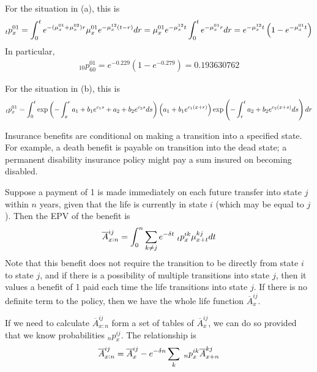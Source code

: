 \documentclass[hidelinks, 12pt]{article}
\theoremstyle{mydefstyle}
\theoremstyle{mythmstyle}
\begin{document}
For the situation in (a), this is
\begin{gather*}
\hspace{0mm}_tp_x^{01}
= \int_0^t e^{-(\mu_x^{01} + \mu_x^{02})r} \mu_x^{01} e^{-\mu_x^{12}(t-r)} dr
= \mu_x^{01} e^{-\mu_x^{12} t} \int_0^t e^{-\mu_x^{01} r} dr
= e^{-\mu_x^{12} t} \left( 1 - e^{-\mu_x^{01} t} \right)
\end{gather*}
In particular,
\begin{gather*}
_{10}p_{60}^{01} = e^{-0.229} \left(1 - e^{-0.279} \right) = 0.193630762
\end{gather*}

For the situation in (b), this is
\begin{gather*}
\hspace{0mm}_tp_x^{01}
= \int_0^t 
\exp \left( - \int_x^r a_1 + b_1 e^{c_1 s} + a_2 + b_2 e^{c_2 s} ds \right)
\left(a_1 + b_1 e^{c_1(x+r)} \right)
\exp \left( - \int_r^t a_2 + b_2 e^{c_2 (x+s) } ds \right) dr
\end{gather*}

Insurance benefits are conditional on making a transition into a specified state. For example, a death benefit is payable on transition into the dead state; a permanent disability insurance policy might pay a sum insured on becoming disabled.

Suppose a payment of 1 is made immediately on each future transfer into state $j$ within $n$ years, given that the life is currently in state $i$ (which may be equal to $j$). Then the EPV of the benefit is
\begin{gather*}
\overline{A}_{x:n}^{ij} = \int_0^n \sum_{k \ne j} e^{-\delta t} \hspace{1mm}_tp_x^{ik} \mu_{x+t}^{kj} dt
\end{gather*}
Note that this benefit does not require the transition to be directly from state $i$ to state $j$, and if there is a possibility of multiple transitions into state $j$, then it values a benefit of 1 paid each time the life transitions into state $j$. If there is no definite term to the policy, then we have the whole life function $\overline{A}_x^{ij}$. 

If we need to calculate $\overline{A}_{x:n}^{ij}$ form a set of tables of $\overline{A}_x^{ij}$, we can do so provided that we know probabilities $_np_x^{ij}$. The relationship is
\begin{gather*}
\overline{A}_{x:n}^{ij} = \overline{A}_x^{ij} - e^{-\delta n} \sum_k \hspace{1mm}_np_x^{ik} \overline{A}_{x+n}^{kj}
\end{gather*}
\end{document}
